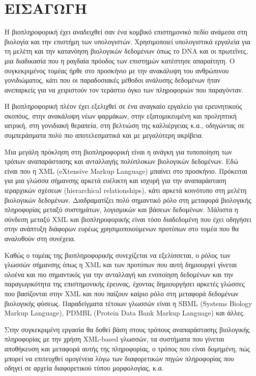 \chapter{ΕΙΣΑΓΩΓΗ}

    Η βιοπληροφορική έχει αναδειχθεί σαν ένα κομβικό επιστημονικό πεδίο ανάμεσα στη βιολογία και την επιστήμη των υπολογιστών.
    Χρησιμοποιεί υπολογιστικά εργαλεία για τη μελέτη και την κατανόηση βιολογικών δεδομένων όπως το DNA και οι πρωτεΐνες, μια διαδικασία που η ραγδαία πρόοδος των επιστημών κατέστησε απαραίτητη.
    Ο συγκεκριμένος τομέας ήρθε στο προσκήνιο με την ανακάλυψη του ανθρώπινου γονιδιώματος, κάτι που οι παραδοσιακές μέθοδοι ανάλυσης δεδομένων ήταν ανεπαρκείς για να χειριστούν τον τεράστιο όγκο των πληροφοριών που παραγόνταν.

    Η βιοπληροφορική πλέον έχει εξελιχθεί σε ένα αναγκαίο εργαλείο για ερευνητικούς σκοπόυς, στην ανακάλυψη νέων φαρμάκων, στην εξατομικευμένη και προληπτική ιατρική, στη γονιδιακή θεραπεία, στη βελτιώση της καλλιέργειας κ.α.,
        οδηγώντας σε συμπεράσματα πολύ πιο αποτελεσματικά και με μεγαλύτερη ακρίβεια.

    Μια μεγάλη πρόκληση στη βιοπληροφορική είναι η ανάγκη για τυποποίηση των τρόπων αναπαράστασης και ανταλλαγής πολύπλοκων βιολογικών δεδομένων.
    Εδώ είναι που η XML (eXtensive Markup Language) μπαίνει στο προσκήνιο.
    Πρόκειται για μια γλώσσα σήμανσης αρκετά ευέλικτη και ισχυρή για την αναπαράσταση ιεραρχικών σχέσεων (hierarchical relationships), κάτι αρκετά κοινότυπο στη μελέτη βιολογικών δεδομένων.
    Διαδραματίζει πολύ σημαντικό ρόλο στη μεταφορά βιολογικής πληροφορίας μεταξύ συστημάτων, λογισμικών και βάσεων δεδομένων.
    Μάλιστα η σύνδεση μεταξύ XML και βιοπληροφορικής είναι τόσο διαδεδομένη που έχει οδηγήσει στην ανάπτυξη διάφορων ευρέως χρησιμοποιούμενων προτύπων στο τομέα που θα αναλυθούν στη συνέχεια.

    Καθώς ο τομέας της βιοπληροφορικής συνεχίζεται να εξελίσσεται, ο ρόλος των γλωσσών σήμανσης όπως η XML και των προτύπων που αυτή δημιουργεί γίνεται ολοένα και πιο σημαντικός για την ανταλλαγή και ενοποίηση δεδομένων και την παραγωγικότητα της επιστημονικής έρευνας,
        έχοντας δημιουργήσει αρκετές γλώσσες που βασίζονται στην XML και που παίζουν καίριο ρόλο στη μεταφορά δεδομένων βιολογικής φύσεως.
    Παραδείγματα τέτοιων γλωσσών είναι η SBML (Systems Biology Markup Language), PDMBL (Protein Data Bank Markup Language) και άλλες.

    Στην συγκεκριμένη εργασία θα δοθεί βάση στους τρόπους αναπαράστασης βιολογικής πληροφορίας με την χρήση XML-based γλωσσών, τα συστήματα που γίνεται αποθήκευση και μεταφορά αυτής της πληροφορίας, ο τρόπος που είναι δομημένη, πώς μπορεί να επιτευχθεί ομογένεια λόγω των διαφορετικών πηγών πληροφορίας που οδηγεί σε αρχεία διαφορετικού τύπου μορφολογίας, κ.α.